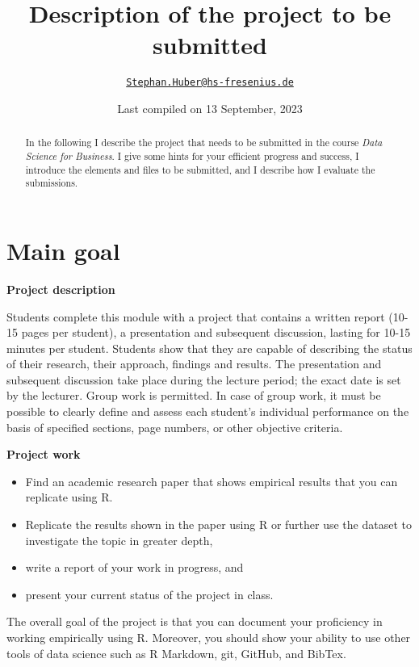 \documentclass[
  12pt,
]{article}
\title{Description of the project to be submitted}
\author{\href{mailto:Stephan.Huber@hs-fresenius.de}{\nolinkurl{Stephan.Huber@hs-fresenius.de}}}
\date{Last compiled on 13 September, 2023}
\providecommand{\tightlist}{%
  \setlength{\itemsep}{0pt}\setlength{\parskip}{0pt}}
\begin{document}
\maketitle
\begin{abstract}
In the following I describe the project that needs to be submitted in the course \emph{Data Science for Business}. I give some hints for your efficient progress and success, I introduce the elements and files to be submitted, and I describe how I evaluate the submissions.
\end{abstract}

{
\hypersetup{linkcolor=}
\setcounter{tocdepth}{3}
\tableofcontents
}
\hypertarget{main-goal}{%
\section{Main goal}\label{main-goal}}

\textbf{Project description}

Students complete this module with a project that contains a written report (10-15 pages per student), a presentation and subsequent discussion, lasting for 10-15 minutes per student. Students show that they are
capable of describing the status of their research, their approach, findings and results. The
presentation and subsequent discussion take place during the lecture period; the exact date is
set by the lecturer.
Group work is permitted. In case of group work, it must be possible to clearly define and assess each student's individual performance on the basis of specified sections, page numbers, or other objective criteria.

\textbf{Project work}

\begin{itemize}
\tightlist
\item
  Find an academic research paper that shows empirical results that you can replicate using R.
\item
  Replicate the results shown in the paper using R or further use the dataset to investigate the topic in greater depth,
\item
  write a report of your work in progress, and
\item
  present your current status of the project in class.
\end{itemize}

The overall goal of the project is that you can document your proficiency in working empirically using R. Moreover, you should show your ability to use other tools of data science such as R Markdown, git, GitHub, and BibTex.
\end{document}
